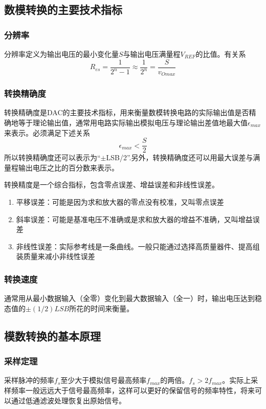 \documentclass{ctexart}
\begin{document}
\subsection{数模转换的主要技术指标}
\subsubsection{分辨率}
分辨率定义为输出电压的最小变化量$S$与输出电压满量程$V_{REF}$的比值。有关系
\begin{equation}
    R_{es}=\dfrac{1}{2^n-1}\approx\dfrac{1}{2^n}=\dfrac{S}{v_{Omax}}
\end{equation}
\subsubsection{转换精确度}
转换精确度是DAC的主要技术指标，用来衡量数模转换电路的实际输出值是否精确地等于理论输出值，通常用电路实际输出模拟电压与理论输出差值地最大值$\epsilon_{max}$来表示。必须满足下述关系
\begin{equation}
    \epsilon_{max}<\dfrac{S}{2}
\end{equation}
所以转换精确度还可以表示为“$\pm$LSB/2”.另外，转换精确度还可以用最大误差与满量程输出电压之比的百分数来表示。

转换精度是一个综合指标，包含零点误差、增益误差和非线性误差。
\begin{enumerate}
    \item 平移误差：可能是因为求和放大器的零点没有校准，又叫零点误差
    \item 斜率误差：可能是基准电压不准确或是求和放大器的增益不准确，又叫增益误差
    \item 非线性误差：实际参考线是一条曲线。一般只能通过选择高质量器件、提高组装质量来减小非线性误差
\end{enumerate}
\subsubsection{转换速度}
通常用从最小数据输入（全零）变化到最大数据输入（全一）时，输出电压达到稳态值的$\pm(1/2)LSB$所花的时间来衡量。
\subsection{模数转换的基本原理}
\subsubsection{采样定理}
采样脉冲的频率$f_s$至少大于模拟信号最高频率$f_{max}$的两倍。$f_s>2f_{max}$。实际上采样频率一般远远大于信号最高频率，这样可以更好的保留信号的频率特性，将来可以通过低通滤波处理恢复出原始信号。
\end{document}
